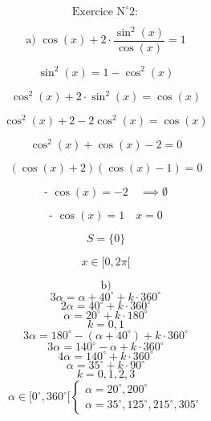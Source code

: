 \documentclass{article}
\begin{document}
\[ \text{Exercice N}^\circ 2: \]

\[ \text{a) } \cos(x) + 2 \cdot \frac{\sin^2(x)}{\cos(x)} = 1 \]

\[ \sin^2(x) = 1 - \cos^2(x) \]

\[ \cos^2(x) + 2 \cdot \sin^2(x) = \cos(x) \]

\[ \cos^2(x) + 2 - 2\cos^2(x) = \cos(x) \]

\[ \cos^2(x) + \cos(x) - 2 = 0 \]

\[ (\cos(x) + 2)(\cos(x) - 1) = 0 \]

\[ \text{- } \cos(x) = -2 \quad \implies \emptyset \]

\[ \text{- } \cos(x) = 1 \quad x = 0 \]

\[ S = \{0\} \]

\[ x \in [0, 2\pi[ \]

\[ \text{b)} \]
\[ 3\alpha = \alpha + 40^\circ + k \cdot 360^\circ \]
\[ 2\alpha = 40^\circ + k \cdot 360^\circ \]
\[ \alpha = 20^\circ + k \cdot 180^\circ \]
\[ k = 0, 1 \]
\[ 3\alpha = 180^\circ - (\alpha + 40^\circ) + k \cdot 360^\circ \]
\[ 3\alpha = 140^\circ - \alpha + k \cdot 360^\circ \]
\[ 4\alpha = 140^\circ + k \cdot 360^\circ \]
\[ \alpha = 35^\circ + k \cdot 90^\circ \]
\[ k = 0, 1, 2, 3 \]
\[ \alpha \in [0^\circ, 360^\circ[ \begin{cases} \alpha = 20^\circ, 200^\circ \\ \alpha = 35^\circ, 125^\circ, 215^\circ, 305^\circ \end{cases} \]
\end{document}

